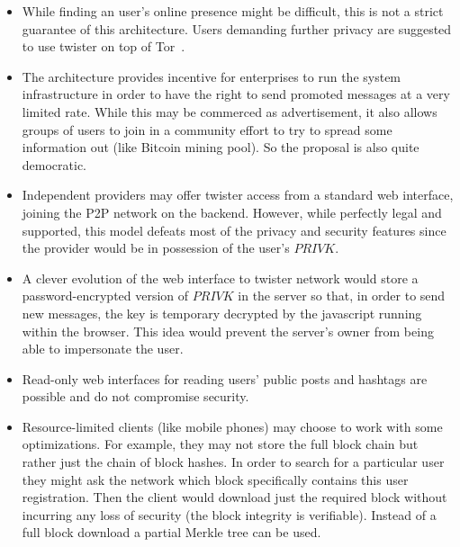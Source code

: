 \documentclass[a4paper,10pt]{article}
\begin{document}
\begin{itemize}
 \item While finding an user's online presence might be difficult, this is not a strict guarantee of this architecture. Users demanding further privacy are suggested to use twister on top of Tor~\cite{torproject}.

 \item The architecture provides incentive for enterprises to run the system infrastructure in order to have the right to send promoted messages at a very limited rate. While this may be commerced as advertisement, it also allows groups of users to join in a community effort to try to spread some information out (like Bitcoin mining pool). So the proposal is also quite democratic.

\item Independent providers may offer twister access from a standard web interface, joining the P2P network on the backend. However, while perfectly legal and supported, this model defeats most of the privacy and security features since the provider would be in possession of the user's $PRIVK$.

\item A clever evolution of the web interface to twister network would store a password-encrypted version of $PRIVK$ in the server so that, in order to send new messages, the key is temporary decrypted by the javascript running within the browser. This idea would prevent the server's owner from being able to impersonate the user.

\item Read-only web interfaces for reading users' public posts and hashtags are possible and do not compromise security.

\item Resource-limited clients (like mobile phones) may choose to work with some optimizations. For example, they may not store the full block chain but rather just the chain of block hashes. In order to search for a particular user they might ask the network which block specifically contains this user registration. Then the client would download just the required block without incurring any loss of security (the block integrity is verifiable). Instead of a full block download a partial Merkle tree can be used.

\end{itemize}



\end{document}
